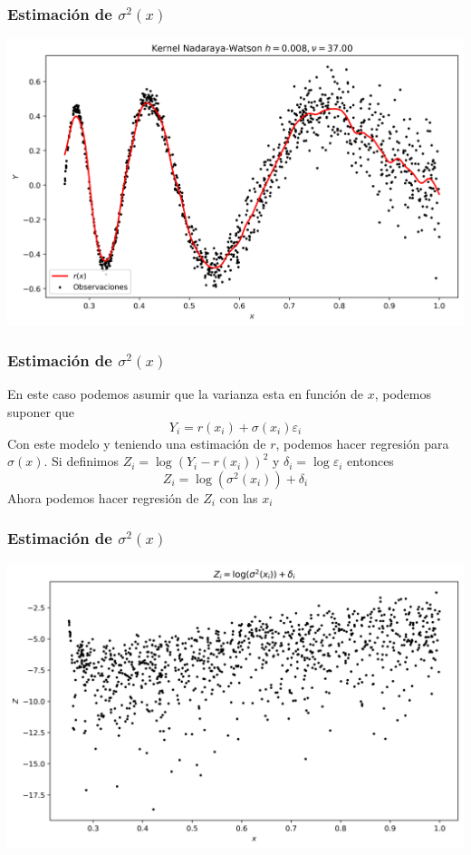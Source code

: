 \documentclass[aspectratio=169,spanish]{beamer}
\begin{document}
\begin{frame}
\frametitle{Estimación de $\sigma^{2}(x)$}

\center
\includegraphics[scale=0.5]{regresionvar2}
\end{frame}


\begin{frame}

\frametitle{Estimación de $\sigma^{2}(x)$}
En este caso podemos asumir que la varianza esta en función de $x$, podemos suponer que 
$$Y_i = r(x_i) + \sigma(x_i)\varepsilon_i$$ 
Con este modelo y teniendo una estimación de $r$, podemos hacer regresión para $\sigma(x)$. Si definimos $Z_i=\log(Y_i-r(x_i))^2$ y $\delta_i=\log\varepsilon_i$ entonces $$Z_i=\log(\sigma^2(x_i))+\delta_i$$
Ahora podemos hacer regresión de $Z_i$ con las $x_i$
\end{frame}

\begin{frame}
\frametitle{Estimación de $\sigma^{2}(x)$}

\center
\includegraphics[scale=0.5]{var}
\end{frame}
\end{document}
